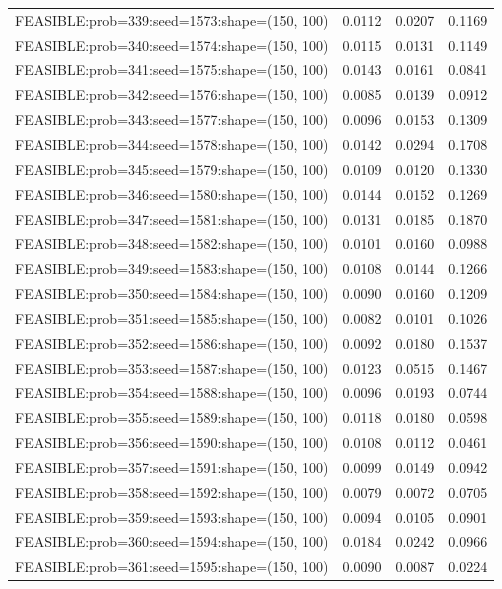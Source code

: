 \begin{longtable}{lccc}
FEASIBLE:prob=339:seed=1573:shape=(150, 100) & 0.0112 & 0.0207 & 0.1169 \\
FEASIBLE:prob=340:seed=1574:shape=(150, 100) & 0.0115 & 0.0131 & 0.1149 \\
FEASIBLE:prob=341:seed=1575:shape=(150, 100) & 0.0143 & 0.0161 & 0.0841 \\
FEASIBLE:prob=342:seed=1576:shape=(150, 100) & 0.0085 & 0.0139 & 0.0912 \\
FEASIBLE:prob=343:seed=1577:shape=(150, 100) & 0.0096 & 0.0153 & 0.1309 \\
FEASIBLE:prob=344:seed=1578:shape=(150, 100) & 0.0142 & 0.0294 & 0.1708 \\
FEASIBLE:prob=345:seed=1579:shape=(150, 100) & 0.0109 & 0.0120 & 0.1330 \\
FEASIBLE:prob=346:seed=1580:shape=(150, 100) & 0.0144 & 0.0152 & 0.1269 \\
FEASIBLE:prob=347:seed=1581:shape=(150, 100) & 0.0131 & 0.0185 & 0.1870 \\
FEASIBLE:prob=348:seed=1582:shape=(150, 100) & 0.0101 & 0.0160 & 0.0988 \\
FEASIBLE:prob=349:seed=1583:shape=(150, 100) & 0.0108 & 0.0144 & 0.1266 \\
FEASIBLE:prob=350:seed=1584:shape=(150, 100) & 0.0090 & 0.0160 & 0.1209 \\
FEASIBLE:prob=351:seed=1585:shape=(150, 100) & 0.0082 & 0.0101 & 0.1026 \\
FEASIBLE:prob=352:seed=1586:shape=(150, 100) & 0.0092 & 0.0180 & 0.1537 \\
FEASIBLE:prob=353:seed=1587:shape=(150, 100) & 0.0123 & 0.0515 & 0.1467 \\
FEASIBLE:prob=354:seed=1588:shape=(150, 100) & 0.0096 & 0.0193 & 0.0744 \\
FEASIBLE:prob=355:seed=1589:shape=(150, 100) & 0.0118 & 0.0180 & 0.0598 \\
FEASIBLE:prob=356:seed=1590:shape=(150, 100) & 0.0108 & 0.0112 & 0.0461 \\
FEASIBLE:prob=357:seed=1591:shape=(150, 100) & 0.0099 & 0.0149 & 0.0942 \\
FEASIBLE:prob=358:seed=1592:shape=(150, 100) & 0.0079 & 0.0072 & 0.0705 \\
FEASIBLE:prob=359:seed=1593:shape=(150, 100) & 0.0094 & 0.0105 & 0.0901 \\
FEASIBLE:prob=360:seed=1594:shape=(150, 100) & 0.0184 & 0.0242 & 0.0966 \\
FEASIBLE:prob=361:seed=1595:shape=(150, 100) & 0.0090 & 0.0087 & 0.0224 \\

\end{longtable}
